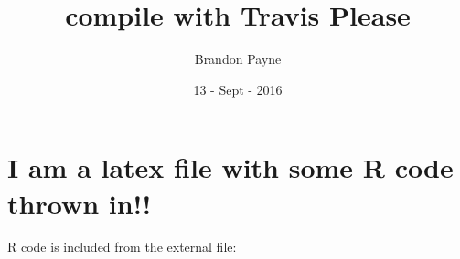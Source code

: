 \documentclass[koma, a4paper, utopia, 12pt]{article}
\author{Brandon Payne}
\date{13 - Sept - 2016}
\title{compile with Travis Please}
\begin{document}
\maketitle


\section{I am a latex file with some R code thrown in!!}
\label{sec:orgheadline1}

R code is included from the external file: 

\end{document}

